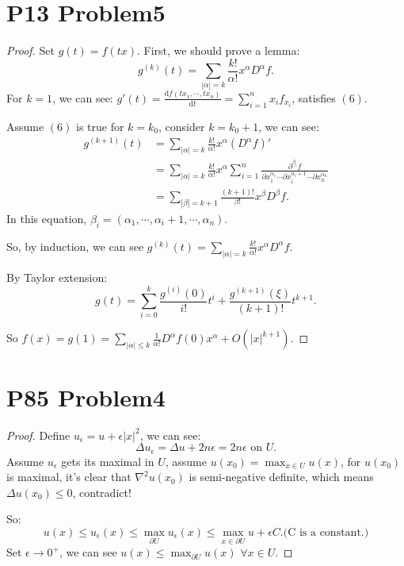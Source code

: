 \documentclass[a4paper]{ctexart}
\newcommand{\dif}{\mathrm{d}}
\newcommand{\difFrac}[2]{\frac{\dif #1}{\dif #2}}
\begin{document}
\section*{P13 Problem5}
\begin{proof}
    Set $g(t)=f(tx)$. First, we should prove a lemma:
    \begin{equation}
    g^{(k)}(t)=\sum_{|\alpha|=k}\frac{k!}{\alpha!}x^{\alpha}D^{\alpha}f.
    \end{equation}
    For $k=1$, we can see:
    $g'(t)=\difFrac{f(tx_{1},\cdots,tx_{n})}{t}=\sum_{i=1}^{n}x_{i}f_{x_{i}}$, satisfies $(6)$.

    Assume $(6)$ is true for $k=k_{0}$, consider $k=k_{0}+1$, we can see:
    \begin{equation}
        \begin{aligned}
            g^{(k+1)}(t)&=\sum_{|\alpha|=k}\frac{k!}{\alpha!}x^{\alpha}(D^{\alpha}f)'\\
            &=\sum_{|\alpha|=k}\frac{k!}{\alpha!}x^{\alpha}\sum_{i=1}^{n}\frac{\partial^{\beta_{i}}f}
            {\partial x_{1}^{\alpha_{1}}\cdots\partial x_{i}^{\alpha_{i}+1}\cdots\partial x_{n}^{\alpha_{n}}}\\
            &=\sum_{|\beta|=k+1}\frac{(k+1)!}{\beta!}x^{\beta}D^{\beta}f.
        \end{aligned}
    \end{equation}
    In this equation, $\beta_{i}=(\alpha_{1},\cdots,\alpha_{i}+1,\cdots,\alpha_{n}).$

    So, by induction, we can see $g^{(k)}(t)=\sum_{|\alpha|=k}\frac{k!}{\alpha!}x^{\alpha}D^{\alpha}f.$

    By Taylor extension:
    $$
    g(t)=\sum_{i=0}^{k}\frac{g^{(i)}(0)}{i!}t^{i}+\frac{g^{(k+1)}(\xi)}{(k+1)!}t^{k+1}.
    $$

    So $f(x)=g(1)=\sum_{|\alpha|\le k}\frac{1}{\alpha!}D^{\alpha}f(0)x^{\alpha}+O(|x|^{k+1})$.
\end{proof}
\section*{P85 Problem4}
\begin{proof}
    Define $u_{\epsilon}=u+\epsilon|x|^{2}$, we can see:
    \begin{equation}
        \Delta u_{\epsilon}=\Delta u+2n\epsilon=2n\epsilon\text{ on }U.
    \end{equation}
    Assume $u_{\epsilon}$ gets its maximal in $U$, assume $u(x_{0})=\max_{x\in U}u(x)$, for 
    $u(x_{0})$ is maximal, it's clear that $\nabla^{2}u(x_{0})$ is semi-negative definite, 
    which means $\Delta u(x_{0})\le 0$, contradict!

    So:
    \begin{equation}
        u(x)\le u_{\epsilon}(x)\le\max_{\partial U}u_{\epsilon}(x)\le\max_{x\in\partial U}u+\epsilon C.\text{(C is a constant.)}
    \end{equation}
    Set $\epsilon\rightarrow 0^{+}$, we can see $u(x)\le\max_{\partial U}u(x)$ $\forall x\in U$.
\end{proof}
\end{document}

